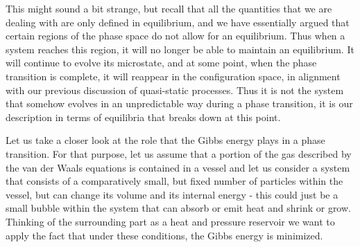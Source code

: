 \documentclass[a4paper, draft]{article}
\theoremstyle{own}
\theoremstyle{remark}
\begin{document}
This might sound a bit strange, but recall that all the quantities that we are dealing with are only defined in equilibrium, and we have essentially argued that certain regions of the phase space do not allow for an equilibrium. Thus when a system reaches this region, it will no longer be able to maintain an equilibrium. It will continue to evolve its microstate, and at some point, when the phase transition is complete, it will reappear in the configuration space, in alignment with our previous discussion of quasi-static processes. Thus it is not the system that somehow evolves in an unpredictable way during a phase transition, it is our description in terms of equilibria that breaks down at this point.

Let us take a closer look at the role that the Gibbs energy plays in a phase transition. For that purpose, let us assume that a portion of the gas described by the van der Waals equations is contained in a vessel and let us consider a system that consists of a comparatively small, but fixed number of particles within the vessel, but can change its volume and its internal energy - this could just be a small bubble within the system that can absorb or emit heat and shrink or grow. Thinking of the surrounding part as a heat and pressure reservoir we want to apply the fact that under these conditions, the Gibbs energy is minimized.
\end{document}
